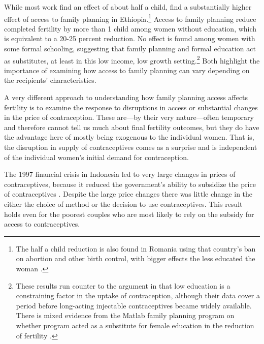 \documentclass[]{article}
\begin{document}
While most work find an effect of about half a child, \citet{Portner2011} find a substantially higher effect of access to family planning in Ethiopia.\footnote{The half a child reduction is also found in Romania using that country's ban on abortion and other birth control, with bigger effects the less educated the woman \citep{Pop-Eleches2010}.} Access to family planning reduce completed fertility by more than 1 child among women without education, which is equivalent to a 20-25 percent reduction. No effect is found among women with some formal schooling, suggesting that family planning and formal education act as substitutes, at least in this low income, low growth setting.\footnote{These results run counter to the argument in \citet{Feyisetan1996} that low education is a constraining factor in the uptake of contraception, although their data cover a period before long-acting injectable contraceptives became widely available. There is mixed evidence from the Matlab family planning program on whether program acted as a substitute for female education in the reduction of fertility \citep{Sinha2005,Joshi2007}.} Both highlight the importance of examining how access to family planning can vary depending on the recipients' characteristics.

A very different approach to understanding how family planning access affects fertility is to examine the response to disruptions in access or substantial changes in the price of contraception. These are---by their very nature---often temporary and therefore cannot tell us much about final fertility outcomes, but they do have the advantage here of mostly being exogenous to the individual women. That is, the disruption in supply of contraceptives comes as a surprise and is independent of the individual women's initial demand for contraception.

The 1997 financial crisis in Indonesia led to very large changes in prices of contraceptives, because it reduced the government's ability to subsidize the price of contraceptives \citep{McKelvey2012}. Despite the large price changes there was little change in the either the choice of method or the decision to use contraceptives. This result holds even for the poorest couples who are most likely to rely on the subsidy for access to contraceptives.
\end{document}
